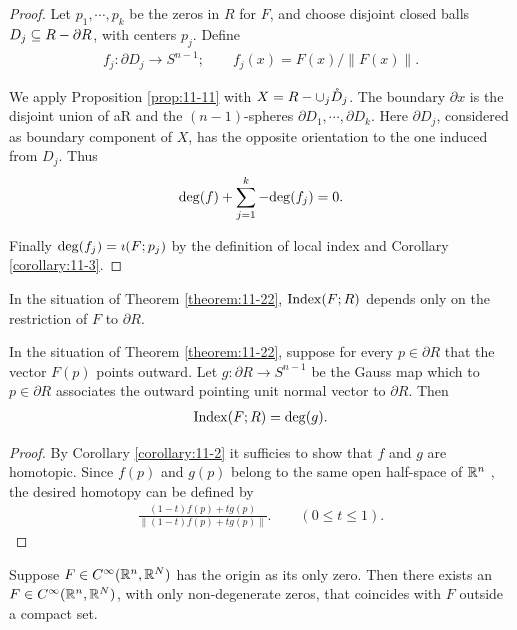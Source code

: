 \begin{proof}
  Let $p_1, \cdots, p_k$ be the zeros in $R$ for $F$, and choose disjoint closed balls
$D_j\subseteq R-\partial R$, with centers $p_j$. Define
\begin{align*}
  f_j: \partial D_j \to S^{n-1}; \qquad f_j(x) = F(x)/\|F(x)\|.
\end{align*}

We apply Proposition \ref{prop:11-11} with $X = R-\cup_{j}\mathring{D}_j$. The boundary $\partial x$ 
is the disjoint union of aR and the $(n - 1)$-spheres $\partial D_1, \cdots, \partial D_k$. Here $\partial D_j$, 
considered as boundary component of $X$, has the opposite orientation to the one induced from $D_j$. 
Thus
\begin{align*}
  \mathrm{deg}(f) + \sum_{j=1}^{k}{-\mathrm{deg}(f_j)} = 0.
\end{align*}

Finally $\mathrm{deg}(f_j) = \imath(F; p_j)$ by the definition of local index and Corollary \ref{corollary:11-3}.
\end{proof}

\begin{corollary}\label{corollary:11-23}
  In the situation of Theorem \ref{theorem:11-22}, $\mathrm{Index}(F; R)$ depends only on
the restriction of $F$ to $\partial R$.
\end{corollary}

\begin{corollary}\label{corollary:11-24}
  In the situation of Theorem \ref{theorem:11-22}, suppose for every $p\in\partial R$ that
  the vector $F(p)$ points outward. Let $g:\partial R\to S^{n-1}$ be the Gauss map which to
  $p\in\partial R$ associates the outward pointing unit normal vector to $\partial R$. Then
  \begin{align*}
    \mathrm{Index}(F; R) = \mathrm{deg}(g).
  \end{align*}
\end{corollary}

\begin{proof}
  By Corollary \ref{corollary:11-2} it sufficies to show that $f$ and $g$ are homotopic. Since
  $f(p)$ and $g(p)$ belong to the same open half-space of $\mathbb{R}^n$ , the desired homotopy
  can be defined by
  \begin{align*}
    \frac{(1-t)f(p) + tg(p)}{\|(1-t)f(p) + tg(p)\|}.\qquad (0\le t\le 1).
    \tag*{\qedsymbol}
  \end{align*}
\end{proof}

\begin{lemma}\label{lemma:11-25}
  Suppose $F\in C^\infty(\mathbb{R}^n, \mathbb{R}^N)$ has the origin as its only zero. Then
  there exists an $F\in C^\infty(\mathbb{R}^n, \mathbb{R}^N)$, with only non-degenerate zeros, that coincides
  with $F$ outside a compact set.
\end{lemma}

